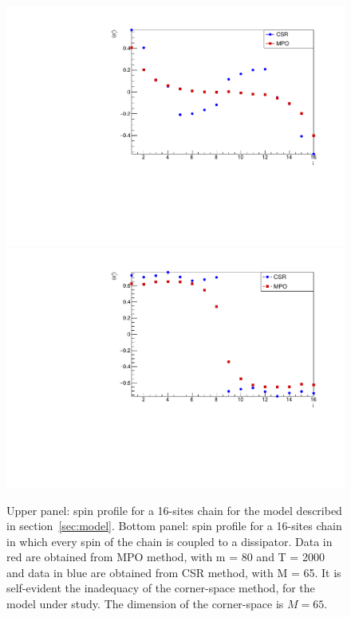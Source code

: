 \begin{figure}[H]
    \centering
    \includegraphics[scale=0.5]{Figures/16sites/LMComparison16s1051.pdf}
    \includegraphics[scale=0.5]{Figures/8U8D_comparisonCSRvsMPO.pdf}
    \captionsetup{width=1.\linewidth}
    \caption{Upper panel: spin profile for a 16-sites chain for the model described in section~\ref{sec:model}. Bottom panel: spin profile for a 16-sites chain in which every spin of the chain is coupled to a dissipator. Data in red are obtained from MPO method, with m = 80 and T = 2000 and data in blue are obtained from CSR method, with M = 65. It is self-evident the inadequacy of the corner-space method, for the model under study. The dimension of the corner-space is $M=65$.}
    \label{fig:LMComparison16s1051}
\end{figure}

